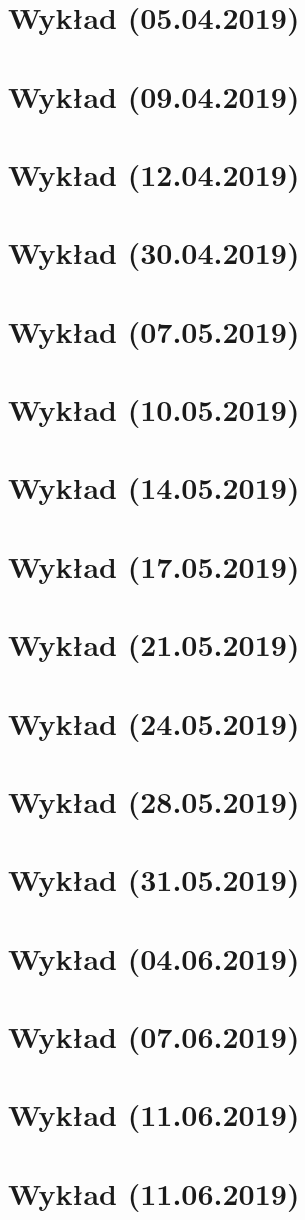 \documentclass[a5paper]{article}
\begin{document}
\section{Wykład (05.04.2019)}

\pagebreak
\section{Wykład (09.04.2019)}

\pagebreak
\section{Wykład (12.04.2019)}

\pagebreak
\section{Wykład (30.04.2019)}

\pagebreak
\section{Wykład (07.05.2019)}

\pagebreak
\section{Wykład (10.05.2019)}

\pagebreak
\section{Wykład (14.05.2019)}

\pagebreak
\section{Wykład (17.05.2019)}

\pagebreak
\section{Wykład (21.05.2019)}

\pagebreak
\section{Wykład (24.05.2019)}

\pagebreak
\section{Wykład (28.05.2019)}

\pagebreak
\section{Wykład (31.05.2019)}

\pagebreak
\section{Wykład (04.06.2019)}

\pagebreak
\section{Wykład (07.06.2019)}

\pagebreak
\section{Wykład (11.06.2019)}

\pagebreak
\section{Wykład (11.06.2019)}

\end{document}
